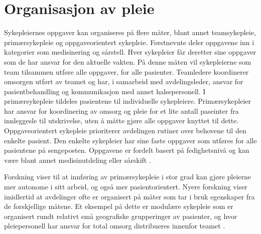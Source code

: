 \section{Organisasjon av pleie}
\label{sec:pleie}

Sykepleiernes oppgaver kan organiseres på flere måter, blant annet teamsykepleie, primærsykepleie og oppgaveorientert sykepleie. Førstnevnte deler oppgavene inn i kategorier som medisinering og sårstell. Hver sykepleier får deretter sine oppgaver som de har ansvar for den aktuelle vakten. På denne måten vil sykepleierne som team tilsammen utføre alle oppgaver, for alle pasienter. Teamledere koordinerer omsorgen utført av teamet og har, i samarbeid med avdelingsleder, ansvar for pasientbehandling og kommunikasjon med annet halsepersonell. I primærsykepleie tildeles pasientene til individuelle sykepleiere. Primærsykepleier har ansvar for koordinering av omsorg og pleie for et lite antall paseinter fra innleggesle til utskrivelse, uten å måtte gjøre alle oppgaver knyttet til dette. Oppgaveorientert sykepleie prioriterer avdelingen rutiner over behovene til den enkelte pasient. Den enkelte sykepleier har sine faste oppgaver som utføres for alle pasientene på sengeposten. Oppgavene er fordelt basert på fedighetsnivå og kan være blant annet medisinutdeling eller sårskift \citep{Rygh13}.

\noindent
Forskning viser til at innføring av primærsykepleie i stor grad kan gjøre pleierne mer autonome i sitt arbeid, og også mer pasientorientert. Nyere forskning viser imidlertid at avdelinger ofte er organisert på måter som tar i bruk egenskaper fra de forskjellige måtene. Et eksempel på dette er modulære sykepleie som er organisert rundt relativt små geografiske grupperinger av pasienter, og hvor pleiepersonell har ansvar for total omsorg distribueres innenfor teamet \citep{Rygh13}.
